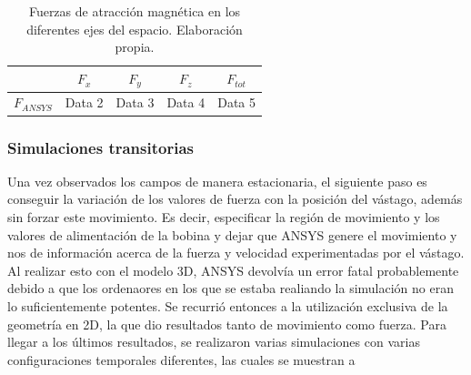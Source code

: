 \begin{table}[h]
    \centering
    \begin{tabular}{|c|c|c|c|c|}
        \hline
        & \(F_x\) & \(F_y\) & \(F_z\) & \(F_{tot}\) \\
        \hline
        \(F_{ANSYS}\) & Data 2 & Data 3 & Data 4 & Data 5 \\
        \hline
    \end{tabular}
    \caption{Fuerzas de atracción magnética en los diferentes ejes del espacio. Elaboración propia.}
    \label{tab:fuerzas}
\end{table}

\subsubsection{Simulaciones transitorias}
Una vez observados los campos de manera estacionaria, el siguiente paso es conseguir la variación de los valores de fuerza con la posición del vástago, además sin forzar este movimiento. Es decir, especificar la región de movimiento y los valores de alimentación de la bobina y dejar que ANSYS genere el movimiento y nos de información acerca de la fuerza y velocidad experimentadas por el vástago. Al realizar esto con el modelo 3D, ANSYS devolvía un error fatal probablemente debido a que los ordenaores en los que se estaba realiando la simulación no eran lo suficientemente potentes. Se recurrió entonces a la utilización exclusiva de la geometría en 2D, la que dio resultados tanto de movimiento como fuerza. Para llegar a los últimos resultados, se realizaron varias simulaciones con varias configuraciones temporales diferentes, las cuales se muestran a 
